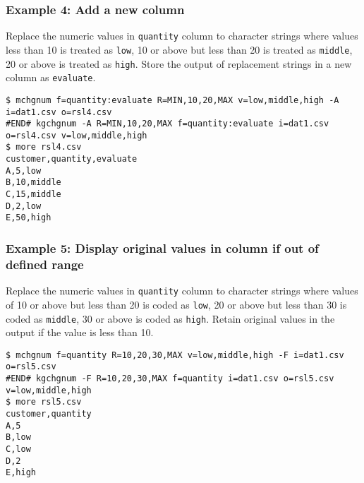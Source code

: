 \subsubsection*{Example 4: Add a new column}

Replace the numeric values in \verb|quantity| column to character strings where values less than 10  is treated as \verb|low|, 10 or above but less than 20 is treated as \verb|middle|, 20 or above is treated as \verb|high|. Store the output of replacement strings in a new column as \verb|evaluate|.


\begin{Verbatim}[baselinestretch=0.7,frame=single]
$ mchgnum f=quantity:evaluate R=MIN,10,20,MAX v=low,middle,high -A i=dat1.csv o=rsl4.csv
#END# kgchgnum -A R=MIN,10,20,MAX f=quantity:evaluate i=dat1.csv o=rsl4.csv v=low,middle,high
$ more rsl4.csv
customer,quantity,evaluate
A,5,low
B,10,middle
C,15,middle
D,2,low
E,50,high
\end{Verbatim}
\subsubsection*{Example 5: Display original values in column if out of defined range}

Replace the numeric values in \verb|quantity| column to character strings where values of 10 or above but less than 20 is coded as \verb|low|, 20 or above but less than 30 is coded as \verb|middle|, 30 or above is coded as \verb|high|. Retain original values in the output if the value is less than 10.


\begin{Verbatim}[baselinestretch=0.7,frame=single]
$ mchgnum f=quantity R=10,20,30,MAX v=low,middle,high -F i=dat1.csv o=rsl5.csv
#END# kgchgnum -F R=10,20,30,MAX f=quantity i=dat1.csv o=rsl5.csv v=low,middle,high
$ more rsl5.csv
customer,quantity
A,5
B,low
C,low
D,2
E,high
\end{Verbatim}
